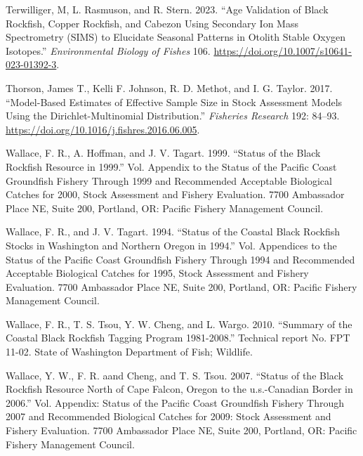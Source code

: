 \documentclass[11pt,
  english,
  letterpaper,
]{article}
\newlength{\cslhangindent}
\newenvironment{CSLReferences}[2] %
 {%
  \setlength{\parindent}{0pt}
  \ifodd #1 \everypar{\setlength{\hangindent}{\cslhangindent}}\ignorespaces\fi
  \ifnum #2 > 0
  \setlength{\parskip}{#2\baselineskip}
  \fi
 }%
 {}
\begin{document}
\begin{CSLReferences}{1}{0}
\leavevmode{}%
Terwilliger, M, L. Rasmuson, and R. Stern. 2023. {``Age Validation of Black Rockfish, Copper Rockfish, and Cabezon Using Secondary Ion Mass Spectrometry (SIMS) to Elucidate Seasonal Patterns in Otolith Stable Oxygen Isotopes.''} \emph{Environmental Biology of Fishes} 106. \url{https://doi.org/10.1007/s10641-023-01392-3}.

\leavevmode{}%
Thorson, James T., Kelli F. Johnson, R. D. Methot, and I. G. Taylor. 2017. {``Model-Based Estimates of Effective Sample Size in Stock Assessment Models Using the {Dirichlet}-Multinomial Distribution.''} \emph{Fisheries Research} 192: 84--93. \url{https://doi.org/10.1016/j.fishres.2016.06.005}.

\leavevmode{}%
Wallace, F. R., A. Hoffman, and J. V. Tagart. 1999. {``Status of the Black Rockfish Resource in 1999.''} Vol. Appendix to the Status of the Pacific Coast Groundfish Fishery Through 1999 and Recommended Acceptable Biological Catches for 2000, Stock Assessment and Fishery Evaluation. 7700 Ambassador Place NE, Suite 200, Portland, OR: Pacific Fishery Management Council.

\leavevmode{}%
Wallace, F. R., and J. V. Tagart. 1994. {``Status of the Coastal Black Rockfish Stocks in Washington and Northern Oregon in 1994.''} Vol. Appendices to the Status of the Pacific Coast Groundfish Fishery Through 1994 and Recommended Acceptable Biological Catches for 1995, Stock Assessment and Fishery Evaluation. 7700 Ambassador Place NE, Suite 200, Portland, OR: Pacific Fishery Management Council.

\leavevmode{}%
Wallace, F. R., T. S. Tsou, Y. W. Cheng, and L. Wargo. 2010. {``Summary of the Coastal Black Rockfish Tagging Program 1981-2008.''} Technical report No. FPT 11-02. State of Washington Department of Fish; Wildlife.

\leavevmode{}%
Wallace, Y. W., F. R. aand Cheng, and T. S. Tsou. 2007. {``Status of the Black Rockfish Resource North of Cape Falcon, Oregon to the u.s.-Canadian Border in 2006.''} Vol. Appendix: Status of the Pacific Coast Groundfish Fishery Through 2007 and Recommended Biological Catches for 2009: Stock Assessment and Fishery Evaluation. 7700 Ambassador Place NE, Suite 200, Portland, OR: Pacific Fishery Management Council.

\end{CSLReferences}
\end{document}
